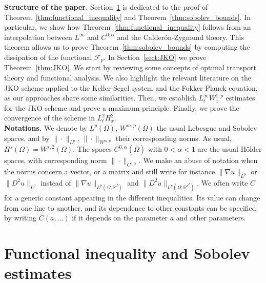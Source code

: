 \documentclass[a4paper,twosided, 11pt]{article}
\newcommand{\R}{\mathbb{R}}
\theoremstyle{plain}
\theoremstyle{remark}
\numberwithin{equation}{section}
\begin{document}
\textbf{Structure of the paper.}
Section~\ref{sect:functional_sobolev} is dedicated to the proof of Theorem~\ref{thm:functional_inequality} and Theorem~\ref{thm:sobolev_bounds}. In particular, we show how Theorem~\ref{thm:functional_inequality} follows from an interpolation between $L^{\infty}$ and $C^{0,\alpha}$ and the Calderón-Zygmund theory. This theorem allows us to prove Theorem~\ref{thm:sobolev_bounds} by computing the dissipation of the functional $\mathcal{F}_{p}$. In Section~\ref{sect:JKO} we prove Theorem~\ref{thm:JKO}. We start by reviewing some concepts of optimal transport theory and functional analysis. We also highlight the relevant literature on the JKO scheme applied to the Keller-Segel system and the Fokker-Planck equation, as our approaches share some similarities. Then, we establish $L^{\infty}_{t}W^{1,p}_{x}$ estimates for the JKO scheme and prove a maximum principle. Finally, we prove the convergence of the scheme in $L^{2}_{t} H^{2}_{x}$.\\


\textbf{Notations.} We denote by $L^{p}(\Omega)$, $W^{m,p}(\Omega)$ the usual Lebesgue and Sobolev spaces, and by $\|\cdot\|_{L^{p}}$, $\|\cdot\|_{W^{m,p}}$ their corresponding norms. As usual, $H^{s}(\Omega) = W^{s,2}(\Omega)$. The spaces $C^{0,\alpha}(\bar{\Omega})$ with $0<\alpha<1$ are the usual Hölder spaces, with corresponding norm $\|\cdot\|_{C^{0,\alpha}}$. We make an abuse of notation when the norms concern a vector, or a matrix and still write for instance $\|\nabla u\|_{L^{p}}$ or $\|D^{2} u\|_{L^{p}}$ instead of $\|\nabla u\|_{L^{p}(\Omega; \R^d)}$ and $\|D^2 u\|_{L^{p}(\Omega;\R^{d^2})}$. We often write $C$ for a generic constant appearing in the different inequalities. Its value can change from one line to another, and its dependence to other constants can be specified by writing $C(a,...)$ if it depends on the parameter $a$ and other parameters. 



\section{Functional inequality and Sobolev estimates}\label{sect:functional_sobolev}
\end{document}
